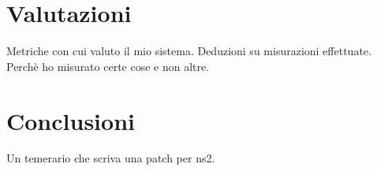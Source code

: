 \documentclass[12pt,a4paper,openright,twoside]{book}
\begin{document}
\chapter{Valutazioni}
Metriche con cui valuto il mio sistema. Deduzioni su misurazioni
effettuate. Perchè ho misurato certe cose e non altre.

\chapter*{Conclusioni}
Un temerario che scriva una patch per ns2.
\end{document}
